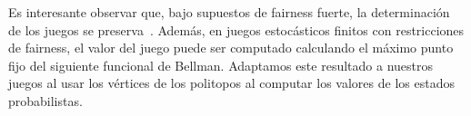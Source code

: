 Es interesante observar que,  bajo supuestos de fairness fuerte, la determinación de los juegos se preserva~\cite{CastroDDP22}. Además, en juegos estocásticos finitos con restricciones de fairness, el valor del juego puede ser computado calculando el máximo punto fijo del siguiente funcional de Bellman. Adaptamos este resultado a nuestros juegos al usar los vértices de los politopos al computar los valores de los estados probabilistas. %
    
